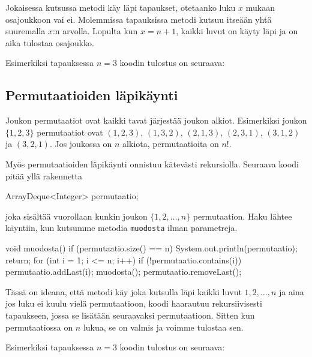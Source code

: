 Jokaisessa kutsussa metodi käy läpi tapaukset,
otetaanko luku $x$ mukaan osajoukkoon vai ei.
Molemmissa tapauksissa metodi kutsuu itseään yhtä
suuremalla $x$:n arvolla.
Lopulta kun $x=n+1$, kaikki luvut on käyty läpi
ja on aika tulostaa osajoukko.

Esimerkiksi tapauksessa $n=3$ koodin tulostus on seuraava:

\begin{code}
[]
[3]
[2]
[2, 3]
[1]
[1, 3]
[1, 2]
[1, 2, 3]
\end{code}

\subsection{Permutaatioiden läpikäynti}

Joukon permutaatiot ovat kaikki tavat järjestää joukon alkiot.
Esimerkiksi joukon $\{1,2,3\}$ permutaatiot ovat
$(1,2,3)$, $(1,3,2)$, $(2,1,3)$, $(2,3,1)$, $(3,1,2)$ ja $(3,2,1)$.
Jos joukossa on $n$ alkiota, permutaatioita on $n!$.

Myös permutaatioiden läpikäynti onnistuu kätevästi rekursiolla.
Seuraava koodi pitää yllä rakennetta

\begin{code}
ArrayDeque<Integer> permutaatio;
\end{code}

joka sisältää vuorollaan kunkin joukon $\{1,2,\dots,n\}$ permutaation.
Haku lähtee käyntiin, kun kutsumme metodia
\texttt{muodosta} ilman parametreja.

\begin{code}
void muodosta() {
    if (permutaatio.size() == n) {
        System.out.println(permutaatio);
        return;
    }
    for (int i = 1; i <= n; i++) {
        if (!permutaatio.contains(i)) {
            permutaatio.addLast(i);
            muodosta();
            permutaatio.removeLast();
        }
    }
}
\end{code}

Tässä on ideana, että metodi käy joka kutsulla läpi kaikki luvut
$1,2,\dots,n$ ja aina jos luku ei kuulu vielä permutaatioon,
koodi haarautuu rekursiivisesti tapaukseen, jossa se lisätään
seuraavaksi permutaatioon.
Sitten kun permutaatiossa on $n$ lukua, se on valmis ja
voimme tulostaa sen.

Esimerkiksi tapauksessa $n=3$ koodin tulostus on seuraava:

\begin{code}
[1, 2, 3]
[1, 3, 2]
[2, 1, 3]
[2, 3, 1]
[3, 1, 2]
[3, 2, 1]
\end{code}


